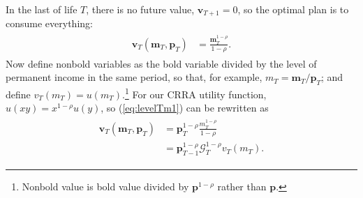 \documentclass[titlepage, headings=optiontotocandhead]{econtex}
\begin{document}
In the last {\interval} of life $T$, there is no future value, $\mathbf{v}_{T+1} = 0$, so the optimal plan is to consume everything:
\begin{equation}\begin{gathered}\begin{aligned}
      \mathbf{v}_{T}(\mathbf{m}_{T},\mathbf{p}_{T})  & = \frac{\mathbf{m}_{T}^{1-\rho}}{1-\rho}. \label{eq:levelTm1}
    \end{aligned}\end{gathered}\end{equation}
Now define nonbold variables as the bold variable divided by the level of permanent income in the same period, so that, for example, $m_{T}=\mathbf{m}_{T}/\mathbf{p}_{T}$; and define $v_{T}(m_{T}) = u(m_{T})$.\footnote{Nonbold value is bold value divided by $\mathbf{p}^{1-\rho}$ rather than $\mathbf{p}$.}  For our CRRA utility function, $u(xy)=x^{1-\rho}u(y)$, so (\ref{eq:levelTm1}) can be rewritten as
\begin{equation}\begin{gathered}\begin{aligned}
      \mathbf{v}_{T}(\mathbf{m}_{T},\mathbf{p}_{T}) & = \mathbf{p}_{T}^{1-\rho}\frac{{m}_{T}^{1-\rho}}{1-\rho}                       \\
                                                &= \mathbf{p}_{T-1}^{1-\rho}\mathcal{G}_{T}^{1-\rho}v_{T}(m_{T}). \label{eq:vT}
    \end{aligned}\end{gathered}\end{equation}
\end{document}
